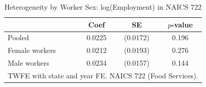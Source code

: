 \begin{table}[t]
\centering
\caption{Heterogeneity by Worker Sex: log(Employment) in NAICS 722}
\label{tab:heterogeneity}
\begin{tabular}{lccc}
\toprule
 & Coef & SE & $p$-value \\
\midrule
Pooled & 0.0225 & (0.0172) & 0.196 \\
Female workers & 0.0212 & (0.0193) & 0.276 \\
Male workers & 0.0234 & (0.0157) & 0.144 \\
\midrule
\multicolumn{4}{l}{\footnotesize TWFE with state and year FE. NAICS 722 (Food Services).} \\
\bottomrule
\end{tabular}
\end{table}

